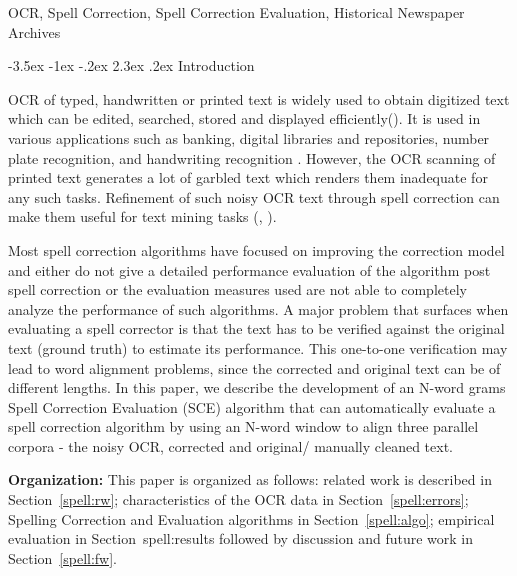 \documentclass[12pt]{article}
\makeatletter
\renewcommand\section{\@startsection{section}{1}{\z@}%
                                  {-3.5ex \@plus -1ex \@minus -.2ex}%
                                  {2.3ex \@plus.2ex}%
                                  {\normalfont\bfseries}}
\makeatother
\begin{document}
 OCR, Spell Correction, Spell Correction Evaluation, Historical Newspaper Archives



\section{Introduction}

OCR of typed, handwritten or printed text is widely used to obtain digitized text which can be edited, searched, stored and displayed efficiently(\cite{torget2011mapping,palfray2012logical}). It is used in various applications such as banking, digital libraries \cite{mcmurdo2013vermont} and repositories, number plate recognition, and handwriting recognition \cite{singh2012survey}. However, the OCR scanning of printed text generates a lot of garbled text which renders them inadequate for any such tasks. Refinement of such noisy OCR text through spell correction can make them useful for text mining tasks (\cite{dutta2011learning}, \cite{yang2011topic}).

Most spell correction algorithms have focused on improving the correction model and either do not give a detailed performance evaluation of the algorithm post spell correction or the evaluation measures used are not able to completely analyze the performance of such algorithms.  
A major problem that surfaces when evaluating a spell corrector is that the text has to be verified against the original text (ground truth) to estimate its performance. This one-to-one verification may lead to word alignment problems, since the corrected and original text can be of different lengths.
In this paper, we describe the development of an N-word grams Spell Correction Evaluation (SCE) algorithm that can automatically evaluate a spell correction algorithm by using an N-word window to align three parallel corpora - the noisy OCR, corrected and original/ manually cleaned text. 

\noindent \textbf{Organization: } This paper is organized as follows: related work is described in Section~\ref{spell:rw}; characteristics of the OCR data in Section~\ref{spell:errors}; Spelling Correction and Evaluation algorithms in Section~\ref{spell:algo}; empirical evaluation in Section~{spell:results} followed by discussion and future work in Section~\ref{spell:fw}. 
\end{document}
